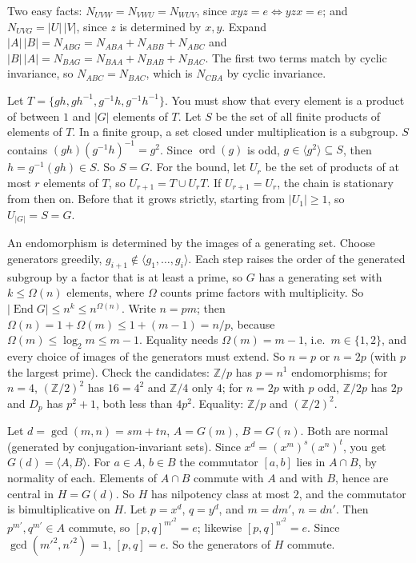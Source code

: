 \documentclass[11pt,a4paper]{article}
\begin{document}

 Two easy facts: $N_{UVW}=N_{VWU}=N_{WUV}$, since $xyz=e\iff yzx=e$; and $N_{UVG}=|U|\,|V|$, since $z$ is determined by $x,y$.
 Expand $|A|\,|B|=N_{ABG}=N_{ABA}+N_{ABB}+N_{ABC}$ and $|B|\,|A|=N_{BAG}=N_{BAA}+N_{BAB}+N_{BAC}$. The first two terms match by cyclic invariance, so $N_{ABC}=N_{BAC}$, which is $N_{CBA}$ by cyclic invariance.

 Let $T=\{gh,gh^{-1},g^{-1}h,g^{-1}h^{-1}\}$. You must show that every element is a product of between $1$ and $|G|$ elements of $T$. Let $S$ be the set of all finite products of elements of $T$. In a finite group, a set closed under multiplication is a subgroup.
 $S$ contains $(gh)(g^{-1}h)^{-1}=g^2$. Since $\operatorname{ord}(g)$ is odd, $g\in\langle g^2\rangle\subseteq S$, then $h=g^{-1}(gh)\in S$. So $S=G$.
 For the bound, let $U_r$ be the set of products of at most $r$ elements of $T$, so $U_{r+1}=T\cup U_rT$. If $U_{r+1}=U_r$, the chain is stationary from then on. Before that it grows strictly, starting from $|U_1|\ge1$, so $U_{|G|}=S=G$.

 An endomorphism is determined by the images of a generating set. Choose generators greedily, $g_{i+1}\notin\langle g_1,\dots,g_i\rangle$. Each step raises the order of the generated subgroup by a factor that is at least a prime, so $G$ has a generating set with $k\le\Omega(n)$ elements, where $\Omega$ counts prime factors with multiplicity.
 So $|\operatorname{End}G|\le n^{k}\le n^{\Omega(n)}$. Write $n=pm$; then $\Omega(n)=1+\Omega(m)\le 1+(m-1)=n/p$, because $\Omega(m)\le\log_2m\le m-1$.
 Equality needs $\Omega(m)=m-1$, i.e.\ $m\in\{1,2\}$, and every choice of images of the generators must extend. So $n=p$ or $n=2p$ (with $p$ the largest prime). Check the candidates: $\mathbb Z/p$ has $p=n^{1}$ endomorphisms; for $n=4$, $(\mathbb Z/2)^2$ has $16=4^2$ and $\mathbb Z/4$ only $4$; for $n=2p$ with $p$ odd, $\mathbb Z/2p$ has $2p$ and $D_p$ has $p^2+1$, both less than $4p^2$. Equality: $\mathbb Z/p$ and $(\mathbb Z/2)^2$.

 Let $d=\gcd(m,n)=sm+tn$, $A=G(m)$, $B=G(n)$. Both are normal (generated by conjugation-invariant sets). Since $x^d=(x^m)^s(x^n)^t$, you get $G(d)=\langle A,B\rangle$.
 For $a\in A$, $b\in B$ the commutator $[a,b]$ lies in $A\cap B$, by normality of each. Elements of $A\cap B$ commute with $A$ and with $B$, hence are central in $H=G(d)$. So $H$ has nilpotency class at most $2$, and the commutator is bimultiplicative on $H$.
 Let $p=x^d$, $q=y^d$, and $m=dm'$, $n=dn'$. Then $p^{m'},q^{m'}\in A$ commute, so $[p,q]^{m'^2}=e$; likewise $[p,q]^{n'^2}=e$. Since $\gcd(m'^2,n'^2)=1$, $[p,q]=e$. So the generators of $H$ commute.
\end{document}
